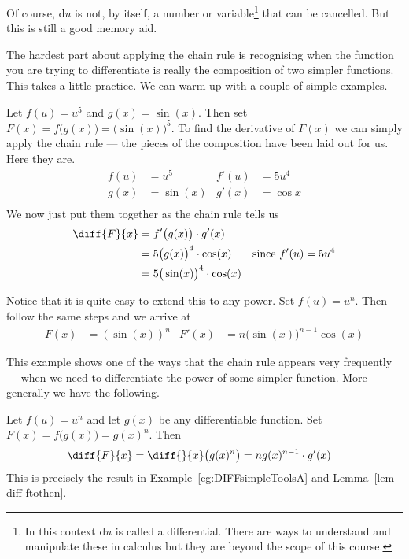 Of course,  $\mathrm{d}u$ is not, by itself, a number or variable\footnote{In
this context $\mathrm{d}u$ is called a differential. There are ways to
understand and manipulate these in calculus but they are beyond the scope of
this course.} that can be cancelled. But this is still a good memory aid.

The hardest part about applying the chain rule is recognising
when the function you are trying to differentiate is really
the composition of two simpler functions. This takes a little practice.
We can warm up with a couple of simple examples.

\begin{eg}\label{eg:DIFFchainruleA}
 Let $f(u) = u^5$ and $g(x) = \sin(x)$. Then set
$F(x) = f\big(g(x)\big) = \big(\sin(x)\big)^5$. To find the
derivative of $F(x)$ we can simply apply the chain rule  ---
the pieces of the composition have been laid out for us. Here
they are.
\begin{align*}
  f(u) &= u^5 & f'(u) &= 5u^4 \\
  g(x) &= \sin(x) & g'(x) &= \cos x \\
\end{align*}
We now just put them together as the chain rule tells us
\begin{align*}
  \diff{F}{x} &= f'\big(g(x)\big) \cdot g'(x) \\
  &= 5\big(g(x)\big)^4 \cdot \cos(x) & \text{since $f'(u) = 5u^4$} \\
  &= 5 \big(\sin(x)\big)^4 \cdot \cos(x)
\end{align*}

Notice that it is quite easy to extend this to any power.
Set $f(u) = u^n$. Then follow the same steps and we arrive at
\begin{align*}
  F(x) &= (\sin(x))^n & F'(x) &= n \big(\sin(x) \big)^{n-1} \cos(x)
\end{align*}
\end{eg}



This example shows one of the ways that the chain rule appears
very frequently --- when we need to differentiate the power of
some simpler function. More generally we have the following.
\begin{eg}\label{eg_2_9_1}
 Let $f(u) = u^n$ and let $g(x)$ be any differentiable function.
Set $F(x) = f\big(g(x)\big) = g(x)^n$. Then
\begin{align*}
  \diff{F}{x} = \diff{}{x} \big( g(x)^n \big) &= n g(x)^{n-1} \cdot g'(x)
\end{align*}
This is precisely the result in Example~\ref{eg:DIFFsimpleToolsA}  and
Lemma~\ref{lem diff ftothen}.
\end{eg}

